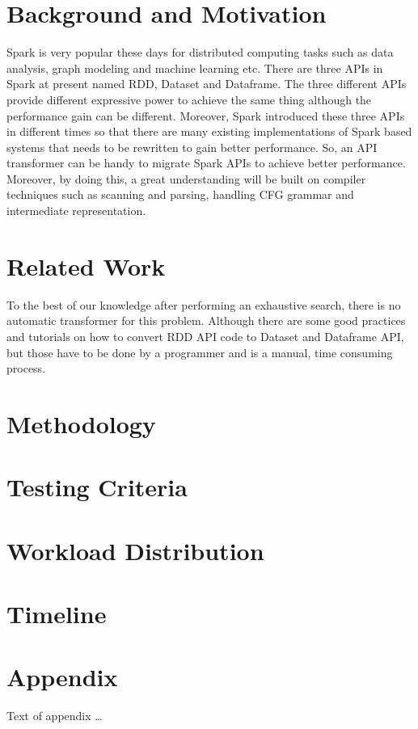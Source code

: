 \documentclass[sigplan, review]{acmart}\settopmatter{printfolios=true,printccs=false,printacmref=false}
\begin{document}
\section{Background and Motivation}
Spark is very popular these days for distributed computing tasks such as data analysis, graph modeling and machine learning etc. There are three APIs in Spark at present named RDD, Dataset and Dataframe. The three different APIs provide different expressive power to achieve the same thing although the performance gain can be different. Moreover, Spark introduced these three APIs in different times so that there are many existing implementations of Spark based systems that needs to be rewritten to gain better performance. So, an API transformer can be handy to migrate Spark APIs to achieve better performance. Moreover, by doing this, a great understanding will be built on compiler techniques such as scanning and parsing, handling CFG grammar and intermediate representation.  

\section{Related Work}
To the best of our knowledge after performing an exhaustive search, there is no automatic transformer for this problem. Although there are some good practices and tutorials on how to convert RDD API code to Dataset and Dataframe API, but those have to be done by a programmer and is a manual, time consuming process. 

\section{Methodology}

\section{Testing Criteria}

\section{Workload Distribution}

\section{Timeline}










\appendix
\section{Appendix}

Text of appendix \ldots
\end{document}
